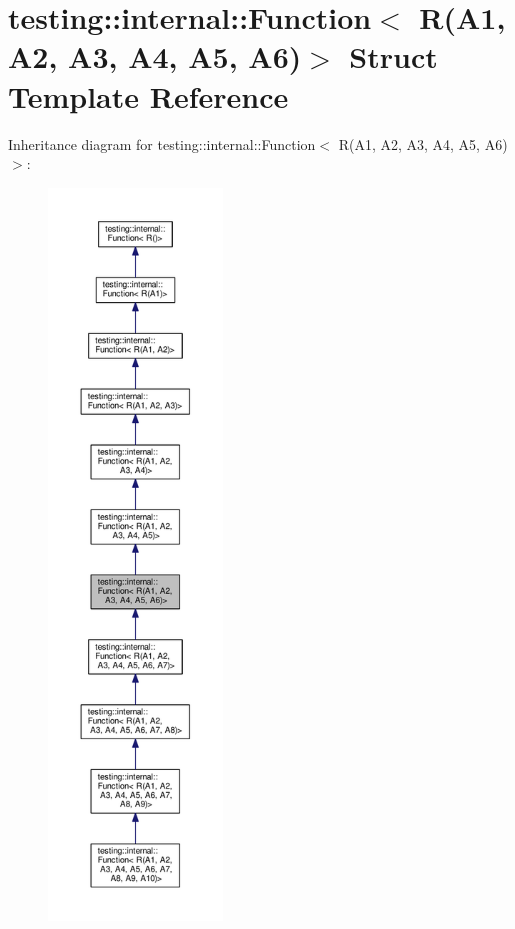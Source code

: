 \hypertarget{structtesting_1_1internal_1_1Function_3_01R_07A1_00_01A2_00_01A3_00_01A4_00_01A5_00_01A6_08_4}{}\section{testing\+:\+:internal\+:\+:Function$<$ R(A1, A2, A3, A4, A5, A6)$>$ Struct Template Reference}
\label{structtesting_1_1internal_1_1Function_3_01R_07A1_00_01A2_00_01A3_00_01A4_00_01A5_00_01A6_08_4}


Inheritance diagram for testing\+:\+:internal\+:\+:Function$<$ R(A1, A2, A3, A4, A5, A6)$>$\+:\nopagebreak
\begin{figure}[H]
\begin{center}
\leavevmode
\includegraphics[height=550pt]{structtesting_1_1internal_1_1Function_3_01R_07A1_00_01A2_00_01A3_00_01A4_00_01A5_00_01A6_08_4__inherit__graph}
\end{center}
\end{figure}


